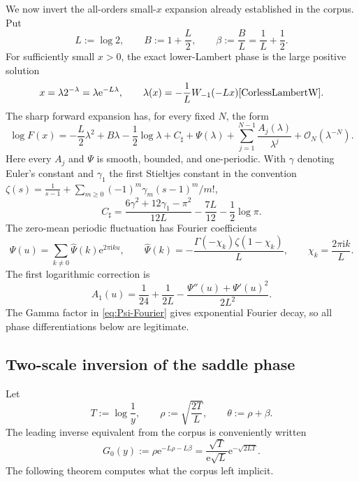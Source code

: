\documentclass[11pt,oneside]{article}
\numberwithin{equation}{section}
\theoremstyle{definition}
\theoremstyle{remark}
\newcommand{\e}{\mathrm e}
\newcommand{\ii}{\mathrm i}
\newcommand{\bigO}{\mathcal O}
\begin{document}
We now invert the all-orders small-$x$ expansion already established in the corpus.
Put
\begin{equation}
 L:=\log2,
 \qquad B:=1+\frac L2,
 \qquad \beta:=\frac BL=\frac1L+\frac12.
 \label{eq:L-B-beta}
\end{equation}
For sufficiently small $x>0$, the exact lower-Lambert phase is the large positive
solution
\begin{equation}
 x=\lambda2^{-\lambda}=\lambda\e^{-L\lambda},
 \qquad
 \lambda(x)=-\frac1L W_{-1}(-Lx) \cite{CorlessLambertW}.
 \label{eq:exact-lower-Lambert}
\end{equation}
The sharp forward expansion has, for every fixed $N$, the form
\begin{equation}
 \boxed{
 \log F(x)=
 -\frac L2\lambda^2+B\lambda-\frac12\log\lambda
 +C_{\sharp}+\Psi(\lambda)
 +\sum_{j=1}^{N-1}\frac{A_j(\lambda)}{\lambda^j}
 +\bigO_N(\lambda^{-N}).}
 \label{eq:forward-endpoint-all-orders}
\end{equation}
Here every $A_j$ and $\Psi$ is smooth, bounded, and one-periodic.  With
$\gamma$ denoting Euler's constant and $\gamma_1$ the first Stieltjes constant in the
convention
\(
 \zeta(s)=\frac1{s-1}+\sum_{m\ge0}(-1)^m\gamma_m(s-1)^m/m!
\),
\begin{equation}
 C_{\sharp}=
 \frac{6\gamma^2+12\gamma_1-\pi^2}{12L}
 -\frac{7L}{12}-\frac12\log\pi.
 \label{eq:Csharp}
\end{equation}
The zero-mean periodic fluctuation has Fourier coefficients
\begin{equation}
 \Psi(u)=\sum_{k\ne0}\widehat\Psi(k)\e^{2\pi\ii ku},
 \qquad
 \widehat\Psi(k)=-\frac{\Gamma(-\chi_k)\zeta(1-\chi_k)}{L},
 \qquad
 \chi_k=\frac{2\pi\ii k}{L}.
 \label{eq:Psi-Fourier}
\end{equation}
The first logarithmic correction is
\begin{equation}
 \boxed{
 A_1(u)=\frac1{24}+\frac1{2L}
 -\frac{\Psi''(u)+\Psi'(u)^2}{2L^2}.}
 \label{eq:A1-periodic}
\end{equation}
The Gamma factor in \eqref{eq:Psi-Fourier} gives exponential Fourier decay, so all
phase differentiations below are legitimate.

\subsection{Two-scale inversion of the saddle phase}

Let
\begin{equation}
 T:=\log\frac1y,
 \qquad
 \rho:=\sqrt{\frac{2T}{L}},
 \qquad
 \theta:=\rho+\beta.
 \label{eq:T-rho-theta}
\end{equation}
The leading inverse equivalent from the corpus is conveniently written
\begin{equation}
 G_0(y):=\rho\e^{-L\rho-L\beta}
 =\frac{\sqrt T}{\e\sqrt L}\e^{-\sqrt{2LT}}.
 \label{eq:G0}
\end{equation}
The following theorem computes what the corpus left implicit.
\end{document}
